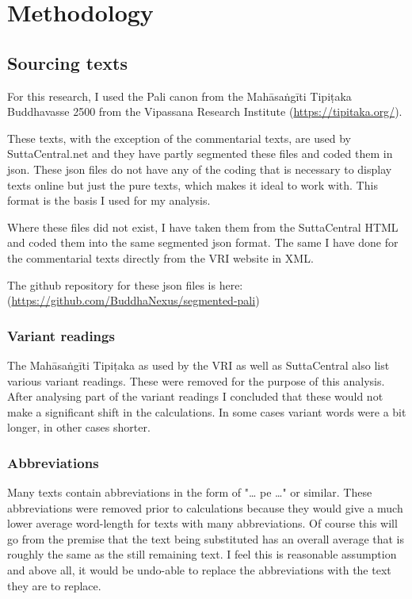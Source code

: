 \section{Methodology}
\subsection{Sourcing texts}
For this research, I used the Pali canon from the Mahāsaṅgīti Tipiṭaka Buddhavasse 2500 from the Vipassana Research Institute (\url{https://tipitaka.org/}).

These texts, with the exception of the commentarial texts, are used by SuttaCentral.net and they have partly segmented these files and coded them in json. These json files do not have any of the coding that is necessary to display texts online but just the pure texts, which makes it ideal to work with. This format is the basis I used for my analysis.

Where these files did not exist, I have taken them from the SuttaCentral HTML and coded them into the same segmented json format. The same I have done for the commentarial texts directly from the VRI website in XML.

The github repository for these json files is here: (\url{https://github.com/BuddhaNexus/segmented-pali})

\subsubsection{Variant readings}
The Mahāsaṅgīti Tipiṭaka as used by the VRI as well as SuttaCentral also list various variant readings. These were removed for the purpose of this analysis. After analysing part of the variant readings I concluded that these would not make a significant shift in the calculations. In some cases variant words were a bit longer, in other cases shorter.

\subsubsection{Abbreviations}
Many texts contain abbreviations in the form of "… pe …" or similar. These abbreviations were removed prior to calculations because they would give a much lower average word-length for texts with many abbreviations. Of course this will go from the premise that the text being substituted has an overall average that is roughly the same as the still remaining text. I feel this is reasonable assumption and above all, it would be undo-able to replace the abbreviations with the text they are to replace.

